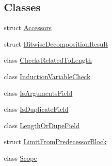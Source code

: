 \subsection*{Classes}
\begin{DoxyCompactItemize}
\item 
struct \hyperlink{structv8_1_1internal_1_1_v8___f_i_n_a_l_1_1_accessors}{Accessors}
\item 
struct \hyperlink{structv8_1_1internal_1_1_v8___f_i_n_a_l_1_1_bitwise_decomposition_result}{Bitwise\+Decomposition\+Result}
\item 
class \hyperlink{classv8_1_1internal_1_1_v8___f_i_n_a_l_1_1_checks_related_to_length}{Checks\+Related\+To\+Length}
\item 
class \hyperlink{classv8_1_1internal_1_1_v8___f_i_n_a_l_1_1_induction_variable_check}{Induction\+Variable\+Check}
\item 
class \hyperlink{classv8_1_1internal_1_1_v8___f_i_n_a_l_1_1_is_arguments_field}{Is\+Arguments\+Field}
\item 
class \hyperlink{classv8_1_1internal_1_1_v8___f_i_n_a_l_1_1_is_duplicate_field}{Is\+Duplicate\+Field}
\item 
class \hyperlink{classv8_1_1internal_1_1_v8___f_i_n_a_l_1_1_length_or_dupe_field}{Length\+Or\+Dupe\+Field}
\item 
struct \hyperlink{structv8_1_1internal_1_1_v8___f_i_n_a_l_1_1_limit_from_predecessor_block}{Limit\+From\+Predecessor\+Block}
\item 
class \hyperlink{classv8_1_1internal_1_1_v8___f_i_n_a_l_1_1_scope}{Scope}
\end{DoxyCompactItemize}
